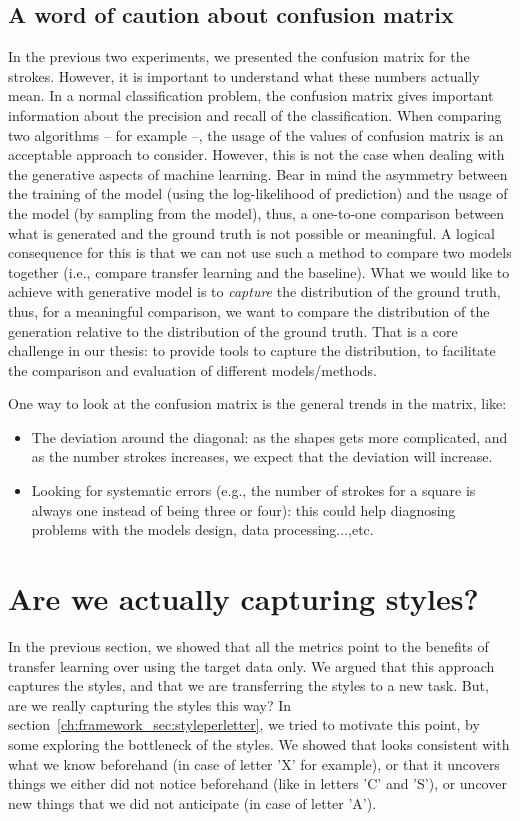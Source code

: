 \subsection{A word of caution about confusion matrix}
\par In the previous two experiments, we presented the confusion matrix for the strokes. However, it is important to understand what these numbers actually mean. In a normal classification problem, the confusion matrix gives important information about the precision and recall of the classification. When comparing two algorithms -- for example --, the usage of the values of confusion matrix is an acceptable approach to consider. However, this is not the case when dealing with the generative aspects of machine learning. Bear in mind the asymmetry between the training of the model (using the log-likelihood of prediction) and the usage of the model (by sampling from the model), thus, a one-to-one comparison between what is generated and the ground truth is not possible or meaningful. A logical consequence for this is that we can not use such a method to compare two models together (i.e., compare transfer learning and the baseline). What we would like to achieve with generative model is to \textit{capture} the distribution of the ground truth, thus, for a meaningful comparison, we want to compare the distribution of the generation relative to the distribution of the ground truth. That is a core challenge in our thesis: to provide tools to capture the distribution, to facilitate the comparison and evaluation of different models/methods.

\par One way to look at the confusion matrix is the general trends in the matrix, like:
\begin{itemize}
  \item The deviation around the diagonal: as the shapes gets more complicated, and as the number strokes increases, we expect that the deviation will increase.
  \item Looking for systematic errors (e.g., the number of strokes for a square is always one instead of being three or four): this could help diagnosing problems with the models design, data processing...,etc.
\end{itemize}

\section{Are we actually capturing styles?} \label{ch:seat_sec:rf}
\par In the previous section, we showed that all the metrics point to the benefits of transfer learning over using the target data only. We argued that this approach captures the styles, and that we are transferring the styles to a new task. But, are we really capturing the styles this way? In section~\ref{ch:framework_sec:styleperletter}, we tried to motivate this point, by some exploring the bottleneck of the styles. We showed that looks consistent with what we know beforehand (in case of letter 'X' for example), or that it uncovers things we either did not notice beforehand (like in letters 'C' and 'S'), or uncover new things that we did not anticipate (in case of letter 'A').

